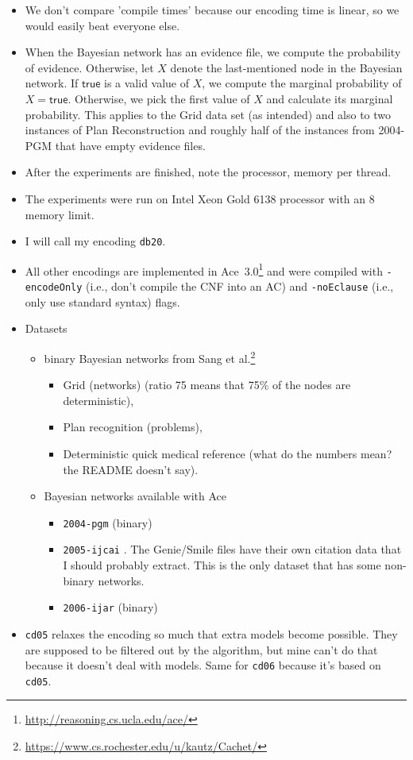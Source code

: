 \documentclass{article}
\theoremstyle{definition}
\theoremstyle{remark}
\begin{document}
\begin{itemize}
\item We don't compare 'compile times' because our encoding time is linear, so
  we would easily beat everyone else.
\item When the Bayesian network has an evidence file, we compute the probability
  of evidence. Otherwise, let $X$ denote the last-mentioned node in the Bayesian
  network. If $\mathsf{true}$ is a valid value of $X$, we compute the marginal
  probability of $X = \mathsf{true}$. Otherwise, we pick the first value of $X$
  and calculate its marginal probability. This applies to the Grid data set (as
  intended) and also to two instances of Plan Reconstruction and roughly half of
  the instances from 2004-PGM that have empty evidence files.
\item After the experiments are finished, note the processor, memory per thread.
\item The experiments were run on Intel Xeon Gold 6138 processor with an
  \SI{8}{\giga\byte} memory limit.
\item I will call my encoding \texttt{db20}.
\item All other encodings are implemented in
  Ace~3.0\footnote{\url{http://reasoning.cs.ucla.edu/ace/}} and were compiled
  with \texttt{-encodeOnly} (i.e., don't compile the CNF into an AC) and
  \texttt{-noEclause} (i.e., only use standard syntax) flags.
\item Datasets
  \begin{itemize}
  \item binary Bayesian networks from Sang et
    al.\footnote{\url{https://www.cs.rochester.edu/u/kautz/Cachet/}}
    \cite{DBLP:conf/aaai/SangBK05}
    \begin{itemize}
    \item Grid (networks) (ratio 75 means that 75\% of the nodes are
      deterministic),
    \item Plan recognition (problems),
    \item Deterministic quick medical reference (what do the numbers mean? the
      README doesn't say).
    \end{itemize}
  \item Bayesian networks available with Ace
    \begin{itemize}
    \item \texttt{2004-pgm} \cite{DBLP:journals/ijar/ChaviraDJ06} (binary)
    \item \texttt{2005-ijcai} \cite{DBLP:conf/ijcai/ChaviraD05}. The Genie/Smile
      files have their own citation data that I should probably extract. This is
      the only dataset that has some non-binary networks.
    \item \texttt{2006-ijar} \cite{DBLP:journals/ijar/ChaviraDJ06} (binary)
    \end{itemize}
  \end{itemize}
\item \texttt{cd05} relaxes the encoding so much that extra models become
  possible. They are supposed to be filtered out by the algorithm, but mine
  can't do that because it doesn't deal with models. Same for \texttt{cd06}
  because it's based on \texttt{cd05}.
\end{itemize}
\end{document}
